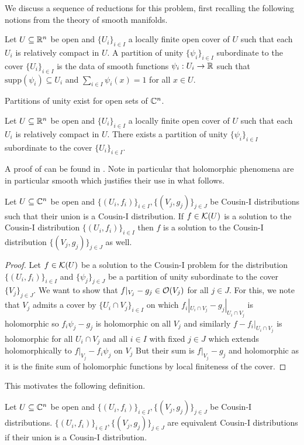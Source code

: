 We discuss a sequence of reductions for this problem, first recalling the following notions from the theory of smooth manifolds. 
\begin{definition}\label{def: partition of unity}
    Let $U\subseteq\mathbb{R}^{n}$ be open and $\{U_{i}\}_{i\in I}$ a locally finite open cover of $U$ such that each $U_{i}$ is relatively compact in $U$. A partition of unity $\{\psi_{i}\}_{i\in I}$ subordinate to the cover $\{U_{i}\}_{i\in I}$ is the data of smooth functions $\psi_{i}:U_{i}\to \mathbb{R}$ such that $\mathrm{supp}(\psi_{i})\subseteq U_{i}$ and $\sum_{i\in I}\psi_{i}(x)=1$ for all $x\in U$. 
\end{definition}
Partitions of unity exist for open sets of $\mathbb{C}^{n}$. 
\begin{proposition}\label{prop: partitions of unity exist}
    Let $U\subseteq\mathbb{R}^{n}$ be open and $\{U_{i}\}_{i\in I}$ a locally finite open cover of $U$ such that each $U_{i}$ is relatively compact in $U$. There exists a partition of unity $\{\psi_{i}\}_{i\in I}$ subordinate to the cover $\{U_{i}\}_{i\in I}$. 
\end{proposition}
A proof of  can be found in \cite[\S 2]{LeeSM}. Note in particular that holomorphic phenomena are in particular smooth which justifies their use in what follows. 

\begin{proposition}\label{prop: equivalent Cousin-I distributions}
    Let $U\subseteq\mathbb{C}^{n}$ be open and $\{(U_{i},f_{i})\}_{i\in I},\{(V_{j},g_{j})\}_{j\in J}$ be Cousin-I distributions such that their union is a Cousin-I distribution. If $f\in\mathcal{K}(U)$ is a solution to the Cousin-I distribution $\{(U_{i},f_{i})\}_{i\in I}$ then $f$ is a solution to the Cousin-I distribution $\{(V_{j},g_{j})\}_{j\in J}$ as well. 
\end{proposition}
\begin{proof}
    Let $f\in\mathcal{K}(U)$ be a solution to the Cousin-I problem for the distribution $\{(U_{i},f_{i})\}_{i\in I}$ and $\{\psi_{j}\}_{j\in J}$ be a partition of unity subordinate to the cover $\{V_{j}\}_{j\in J}$. We want to show that $f|_{V_{j}}-g_{j}\in\mathcal{O}(V_{j})$ for all $j\in J$. For this, we note that $V_{j}$ admits a cover by $\{U_{i}\cap V_{j}\}_{i\in I}$ on which $f_{i}|_{U_{i}\cap V_{j}}-g_{j}|_{U_{i}\cap V_{j}}$ is holomorphic so $f_{i}\psi_{j}-g_{j}$ is holomorphic on all $V_{j}$ and similarly $f-f_{i}|_{U_{i}\cap V_{j}}$ is holomorphic for all $U_{i}\cap V_{j}$ and all $i\in I$ with fixed $j\in J$ which extends holomorphically to $f|_{V_{j}}-f_{i}\psi_{j}$ on $V_{j}$ But their sum is $f|_{V_{j}}-g_{j}$ and holomorphic as it is the finite sum of holomorphic functions by local finiteness of the cover. 
\end{proof}
This motivates the following definition. 
\begin{definition}
    Let $U\subseteq\mathbb{C}^{n}$ be open and $\{(U_{i},f_{i})\}_{i\in I},\{(V_{j},g_{j})\}_{j\in J}$ be Cousin-I distributions. $\{(U_{i},f_{i})\}_{i\in I},\{(V_{j},g_{j})\}_{j\in J}$ are equivalent Cousin-I distributions if their union is a Cousin-I distribution. 
\end{definition}

